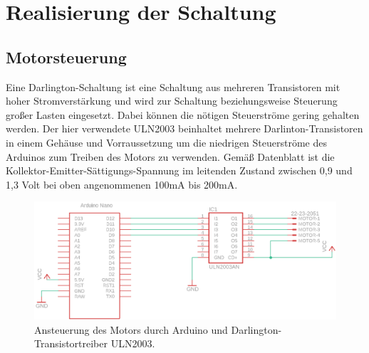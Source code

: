 \documentclass[11pt, titlepage, fleqn]{report}
\begin{document}
		\section{Realisierung der Schaltung}
			\subsection{Motorsteuerung}
				Eine Darlington-Schaltung ist eine Schaltung aus mehreren Transistoren mit hoher Stromverstärkung und wird zur Schaltung beziehungsweise Steuerung großer Lasten eingesetzt. Dabei können die nötigen Steuerströme gering gehalten werden. Der hier verwendete ULN2003 beinhaltet mehrere Darlinton-Transistoren in einem 
				Gehäuse und Vorraussetzung um die niedrigen Steuerströme des Arduinos zum Treiben des Motors zu verwenden. Gemäß Datenblatt ist die Kollektor-Emitter-Sättigungs-Spannung im leitenden Zustand zwischen 0,9 und 1,3 Volt bei oben angenommenen 100mA bis 200mA.
				\begin{figure}[htbp]
					\centering
					\includegraphics[width=\linewidth]{./img/Motorsteuerung.png}
					\caption{ Ansteuerung des Motors durch Arduino und  Darlington-Transistortreiber ULN2003.
					\label{fig:imgMotorsteuerung}}
				\end{figure}
			\newpage
\end{document}
